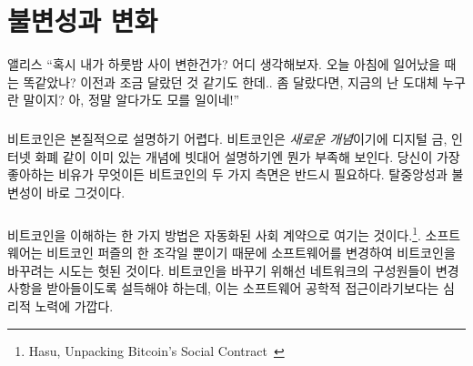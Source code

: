 \chapter{불변성과 변화}
\label{les:1}

\begin{chapquote}{앨리스}
	\enquote{혹시 내가 하룻밤 사이 변한건가? 어디 생각해보자.
		오늘 아침에 일어났을 때는 똑같았나? 이전과 조금 달랐던 것 같기도 한데.. 
		좀 달랐다면, 지금의 난 도대체 누구란 말이지? 아, 정말 알다가도 모를 일이네!}
\end{chapquote}

\paragraph{}
비트코인은 본질적으로 설명하기 어렵다. 
비트코인은 \textit{새로운 개념}이기에 디지털 금, 인터넷 화폐 같이 이미 있는 개념에 빗대어 설명하기엔 뭔가 부족해 보인다. 
당신이 가장 좋아하는 비유가 무엇이든 비트코인의 두 가지 측면은 반드시 필요하다. 탈중앙성과 불변성이 바로 그것이다.

\paragraph{}
비트코인을 이해하는 한 가지 방법은 자동화된 사회 계약으로 여기는 것이다.\footnote{Hasu, Unpacking Bitcoin's Social Contract~\cite{social-contract}}. 
소프트웨어는 비트코인 퍼즐의 한 조각일 뿐이기 때문에 소프트웨어를 변경하여 비트코인을 바꾸려는 시도는 헛된 것이다.
비트코인을 바꾸기 위해선 네트워크의 구성원들이 변경 사항을 받아들이도록 설득해야 하는데, 이는 소프트웨어 공학적 접근이라기보다는 심리적 노력에 가깝다.

